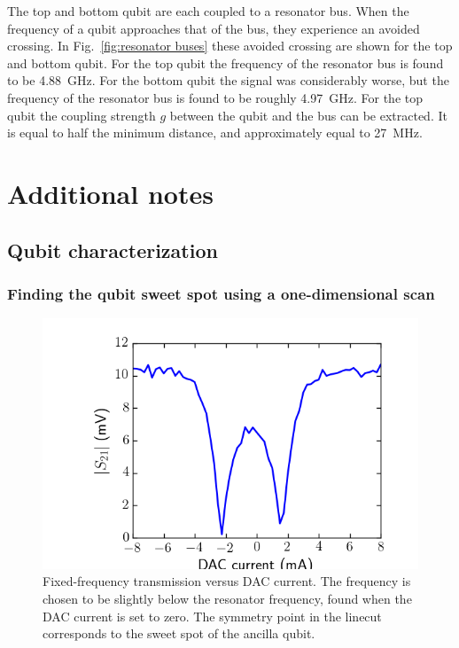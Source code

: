     The top and bottom qubit are each coupled to a resonator bus. When the frequency of a qubit approaches that of the bus, they experience an avoided crossing. In Fig.~\ref{fig:resonator buses} these avoided crossing are shown for the top and bottom qubit. For the top qubit the frequency of the resonator bus is found to be \SI{4.88}{\giga \hertz}. For the bottom qubit the signal was considerably worse, but the frequency of the resonator bus is found to be roughly \SI{4.97}{\giga \hertz}. For the top qubit the coupling strength $g$ between the qubit and the bus can be extracted. It is equal to half the minimum distance, and approximately equal to \SI{27}{\mega \hertz}.

\chapter{Additional notes}
  \section{Qubit characterization}
      \subsection{Finding the qubit sweet spot using a one-dimensional scan}
        \label{Finding the qubit sweet spot using a one-dimensional scan}
        \begin{figure}[tb]
          \centering
          \includegraphics[width=.6\linewidth]{Figures/Qubit characterization/Resonator vs DAC linecut.png}
          \caption{Fixed-frequency transmission versus DAC current. The frequency is chosen to be slightly below the resonator frequency, found when the DAC current is set to zero. The symmetry point in the linecut corresponds to the sweet spot of the ancilla qubit.}
          \label{fig:resonator vs dac linecut}
        \end{figure}

